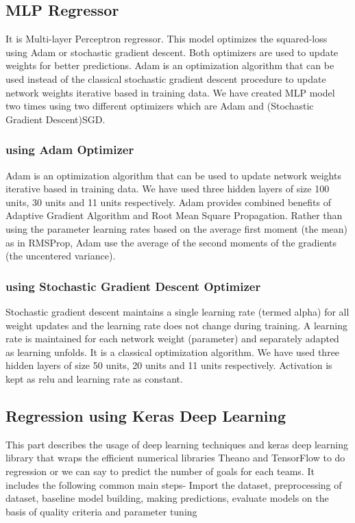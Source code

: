 \subsection{MLP Regressor}
It is Multi-layer Perceptron regressor. This model optimizes the squared-loss using Adam or stochastic gradient descent. Both optimizers are used to update weights for better predictions. Adam is an optimization algorithm that can be used instead of the classical stochastic gradient descent procedure to update network weights iterative based in training data. We have created MLP model two times using two different optimizers which are Adam and (Stochastic Gradient Descent)SGD.\newline
\subsubsection{using Adam Optimizer }
Adam is an optimization algorithm that can be used to update network weights iterative based in training data. We have used three hidden layers of size 100 units, 30 units and 11 units respectively. Adam provides combined benefits of Adaptive Gradient Algorithm and Root Mean Square Propagation. Rather than using the parameter learning rates based on the average first moment (the mean) as in RMSProp, Adam use the average of the second moments of the gradients (the uncentered variance).\newline
\subsubsection{using Stochastic Gradient Descent Optimizer }
Stochastic gradient descent maintains a single learning rate (termed alpha) for all weight updates and the learning rate does not change during training. A learning rate is maintained for each network weight (parameter) and separately adapted as learning unfolds. It is a classical optimization algorithm. We have used three hidden layers of size 50 units, 20 units and 11 units respectively. Activation is kept as relu and learning rate as constant.\newline
\subsection{Regression using Keras Deep Learning }
This part describes the usage of deep learning techniques and keras deep learning library that wraps the efficient numerical libraries Theano and TensorFlow to do regression or we can say to predict the number of goals for each teams. It includes the following common main steps- Import the dataset, preprocessing of dataset, baseline model building, making predictions, evaluate models on the basis of quality criteria and parameter tuning 
